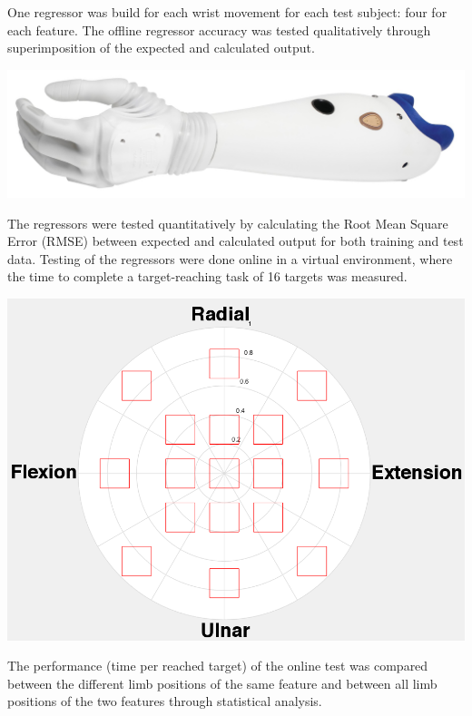 \documentclass[landscape,a0paper,fontscale=0.375]{baposter} %
\begin{document}
\begin{poster}
{%

One regressor was build for each wrist movement for each test subject: four for each feature. The offline regressor accuracy was tested qualitatively through superimposition of the expected and calculated output. 

\begin{center}
	\includegraphics[width=0.5\linewidth]{mic3.png}
\end{center} \vspace{-0.3cm}

The regressors were tested quantitatively by calculating the Root Mean Square Error (RMSE) between expected and calculated output for both training and test data. Testing of the regressors were done online in a virtual environment, where the time to complete a target-reaching task of 16 targets was measured. 

\begin{center}
	\includegraphics[width=0.8\linewidth]{NewPlacesToGo.png}
\end{center} \vspace{-0.3cm}

The performance (time per reached target) of the online test was compared between the different limb positions of the same feature and between all limb positions of the two features through statistical analysis.
}


\end{poster}
\end{document}
